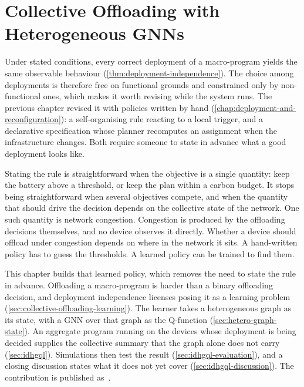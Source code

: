 \chapter{Collective Offloading with Heterogeneous GNNs}
\label{chap:heterogeneous-gnn}


Under stated conditions, every correct deployment of a macro-program yields the same observable behaviour (\cref{thm:deployment-independence}).
%
The choice among deployments is therefore free on functional grounds and constrained only by non-functional ones,
which makes it worth revising while the system runs.
%
The previous chapter revised it with policies written by hand (\cref{chap:deployment-and-reconfiguration}):
a self-organising rule reacting to a local trigger, and a declarative specification whose planner recomputes an assignment when the infrastructure changes.
%
Both require someone to state in advance what a good deployment looks like.

Stating the rule is straightforward when the objective is a single quantity:
keep the battery above a threshold, or keep the plan within a carbon budget.
%
It stops being straightforward when several objectives compete,
and when the quantity that should drive the decision depends on the collective state of the network.
%
One such quantity is network congestion.
%
Congestion is produced by the offloading decisions themselves, and no device observes it directly.
Whether a device should offload under congestion depends on where in the network it sits.
%
A hand-written policy has to guess the thresholds.
A learned policy can be trained to find them.

This chapter builds that learned policy, which removes the need to state the rule in advance.
%
Offloading a macro-program is harder than a binary offloading decision,
and deployment independence licenses posing it as a learning problem (\cref{sec:collective-offloading-learning}).
%
The learner takes a heterogeneous graph as its state, with a \ac{GNN} over that graph as the Q-function (\cref{sec:hetero-graph-state}).
An aggregate program running on the devices whose deployment is being decided supplies the collective summary that the graph alone does not carry (\cref{sec:idhgql}).
%
Simulations then test the result (\cref{sec:idhgql-evaluation}), and a closing discussion states what it does not yet cover (\cref{sec:idhgql-discussion}).
%
The contribution is published as~\cite{Farabegoli:2026:HeteroGNN}.

